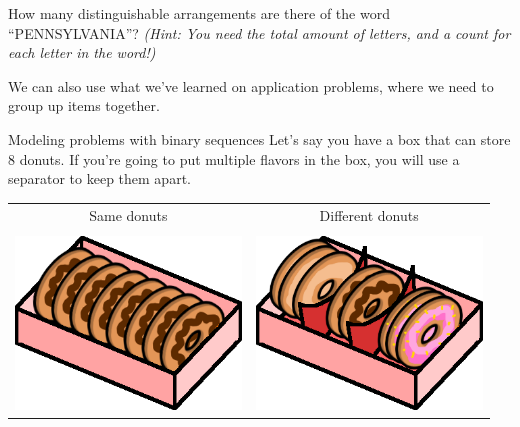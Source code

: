 {    
    \begin{questionNOGRADE}{\thequestion}
	    How many distinguishable arrangements are there of the word \\ ``PENNSYLVANIA''?
	    \textit{(Hint: You need the total amount of letters, and a count for each letter in the word!)}
	\end{questionNOGRADE}

    \hrulefill

    We can also use what we've learned on application problems, where we need to
    group up items together.

    \newpage

    \begin{intro}{Modeling problems with binary sequences}
        Let's say you have a box that can store 8 donuts.
        If you're going to put multiple flavors in the box, you will
        use a separator to keep them apart.

        \begin{center}
            \begin{tabular}{c c}
                Same donuts & 
                Different donuts
                \\ \\
                \centering
                \includegraphics[width=6cm]{images/donutbox1.png}
                &
                \includegraphics[width=6cm]{images/donutbox2.png}
            \end{tabular}
        \end{center}


\end{intro}}
